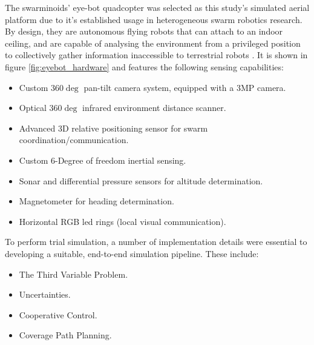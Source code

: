 \documentclass{report}
\begin{document}
The swarminoids' \cite{Dorigo2013} eye-bot quadcopter was selected as this study's simulated aerial platform due to it's established usage in heterogeneous swarm robotics research. By design, they are autonomous flying robots that can attach to an indoor ceiling, and are capable of analysing the environment from a privileged position to collectively gather information inaccessible to terrestrial robots \cite{Dorigo2013}. It is shown in figure \ref{fig:eyebot_hardware} and features the following sensing capabilities:
\begin{itemize}
    \item Custom $360\deg$ pan-tilt camera system, equipped with a 3MP camera.
    \item Optical $360\deg$ infrared environment distance scanner.
    \item Advanced 3D relative positioning sensor for swarm coordination/communication.
    \item Custom 6-Degree of freedom inertial sensing.
    \item Sonar and differential pressure sensors for altitude determination.
    \item Magnetometer for heading determination.
    \item Horizontal RGB led rings (local visual communication).
\end{itemize}

To perform trial simulation, a number of implementation details were essential to developing a suitable, end-to-end simulation pipeline. These include:
\begin{itemize}
	\item The Third Variable Problem.
	\item Uncertainties.
	\item Cooperative Control.
	\item Coverage Path Planning.
\end{itemize}
\end{document}
